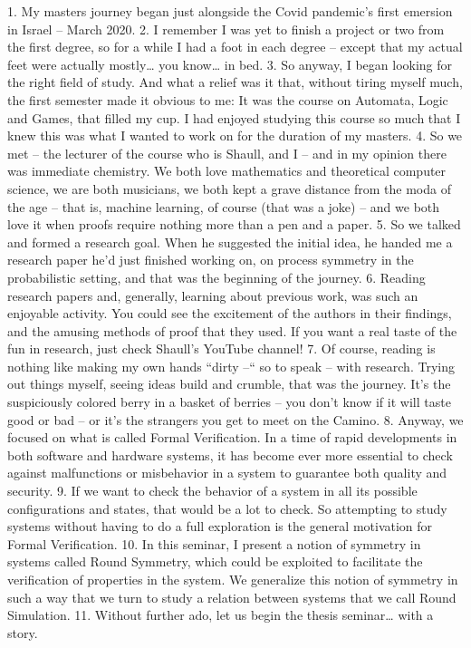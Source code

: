 {1.	My masters journey began just alongside the Covid pandemic’s first emersion in Israel – March 2020.
2.	I remember I was yet to finish a project or two from the first degree, so for a while I had a foot in each degree – except that my actual feet were actually mostly… you know… in bed.
3.	So anyway, I began looking for the right field of study. And what a relief was it that, without tiring myself much, the first semester made it obvious to me: It was the course on Automata, Logic and Games, that filled my cup. I had enjoyed studying this course so much that I knew this was what I wanted to work on for the duration of my masters.
4.	So we met – the lecturer of the course who is Shaull, and I – and in my opinion there was immediate chemistry. We both love mathematics and theoretical computer science, we are both musicians, we both kept a grave distance from the moda of the age – that is, machine learning, of course (that was a joke) – and we both love it when proofs require nothing more than a pen and a paper.
5.	So we talked and formed a research goal. When he suggested the initial idea, he handed me a research paper he’d just finished working on, on process symmetry in the probabilistic setting, and that was the beginning of the journey.
6.	Reading research papers and, generally, learning about previous work, was such an enjoyable activity. You could see the excitement of the authors in their findings, and the amusing methods of proof that they used. If you want a real taste of the fun in research, just check Shaull’s YouTube channel!
7.	Of course, reading is nothing like making my own hands “dirty –“ so to speak – with research. Trying out things myself, seeing ideas build and crumble, that was the journey. It’s the suspiciously colored berry in a basket of berries – you don’t know if it will taste good or bad – or it’s the strangers you get to meet on the Camino.
8.	Anyway, we focused on what is called Formal Verification. In a time of rapid developments in both software and hardware systems, it has become ever more essential to check against malfunctions or misbehavior in a system to guarantee both quality and security.
9.	If we want to check the behavior of a system in all its possible configurations and states, that would be a lot to check. So attempting to study systems without having to do a full exploration is the general motivation for Formal Verification.
10.	In this seminar, I present a notion of symmetry in systems called Round Symmetry, which could be exploited to facilitate the verification of properties in the system. We generalize this notion of symmetry in such a way that we turn to study a relation between systems that we call Round Simulation.
11.	Without further ado, let us begin the thesis seminar… with a story.

}

